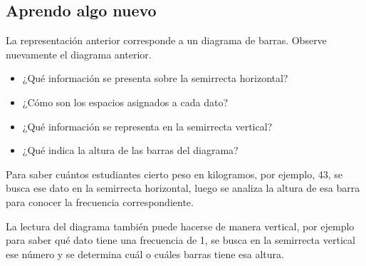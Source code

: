 \documentclass[10pt,twoside]{article}
\begin{document}
\subsection*{Aprendo algo nuevo}

La representación anterior corresponde a un diagrama de barras. Observe nuevamente el diagrama anterior.
\begin{itemize}
\item ¿Qué información se presenta sobre la semirrecta horizontal?
\item ¿Cómo son los espacios asignados a cada dato?
\item ¿Qué información se representa en la semirrecta vertical? 
\item ¿Qué indica la altura de las barras del diagrama?
\end{itemize}
Para saber cuántos estudiantes cierto peso en kilogramos, por ejemplo, 43, se busca ese dato en la semirrecta horizontal, luego se analiza la altura de esa barra para conocer la frecuencia correspondiente.

La lectura del diagrama también puede hacerse de manera vertical, por ejemplo para saber qué dato tiene una frecuencia de 1, se busca en la semirrecta vertical ese número y se determina cuál o cuáles barras tiene esa altura.
\end{document}
